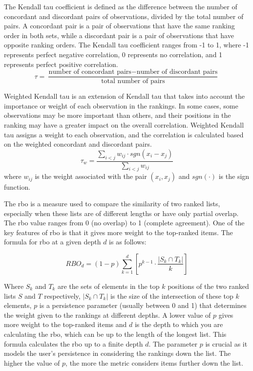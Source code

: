 The Kendall tau coefficient \cite{kendallTreatmentTiesRanking1945} is defined as the difference between the number of concordant and discordant pairs of observations, divided by the total number of pairs. A concordant pair is a pair of observations that have the same ranking order in both sets, while a discordant pair is a pair of observations that have opposite ranking orders. The Kendall tau coefficient ranges from -1 to 1, where -1 represents perfect negative correlation, 0 represents no correlation, and 1 represents perfect positive correlation. 
\[
\tau = \frac{{\text{{number of concordant pairs}} - \text{{number of discordant pairs}}}}{{\text{{total number of pairs}}}}
\]


Weighted Kendall tau  \cite{vignaWeightedCorrelationIndex2015} is an extension of Kendall tau that takes into account the importance or weight of each observation in the rankings. In some cases, some observations may be more important than others, and their positions in the ranking may have a greater impact on the overall correlation. Weighted Kendall tau assigns a weight to each observation, and the correlation is calculated based on the weighted concordant and discordant pairs.
\[
\tau_w = \frac{{\sum_{i<j} w_{ij} \cdot sgn(x_i - x_j)}}{{\sum_{i<j} w_{ij}}}
\]
where $w_{ij}$ is the weight associated with the pair $(x_i, x_j)$ and $sgn(\cdot)$ is the sign function.

The \ac{rbo} \cite{webberSimilarityMeasureIndefinite2010} is a measure used to compare the similarity of two ranked lists, especially when these lists are of different lengths or have only partial overlap. The \ac{rbo} value ranges from 0 (no overlap) to 1 (complete agreement). One of the key features of \ac{rbo} is that it gives more weight to the top-ranked items. The formula for \ac{rbo} at a given depth \( d \) is as follows:

\[
RBO_d = (1 - p) \sum_{k=1}^{d} \left[ p^{k-1} \cdot \frac{|S_{k} \cap T_{k}|}{k} \right]
\]

Where  \( S_{k} \) and \( T_{k} \) are the sets of elements in the top \( k \) positions of the two ranked lists \( S \) and \( T \) respectively, \( |S_{k} \cap T_{k}| \) is the size of the intersection of these top \( k \) elements, \( p \) is a persistence parameter (usually between 0 and 1) that determines the weight given to the rankings at different depths. A lower value of \( p \) gives more weight to the top-ranked items and \( d \) is the depth to which you are calculating the \ac{rbo}, which can be up to the length of the longest list. This formula calculates the \ac{rbo} up to a finite depth \( d \). The parameter \( p \) is crucial as it models the user's persistence in considering the rankings down the list. The higher the value of \( p \), the more the metric considers items further down the list. 


